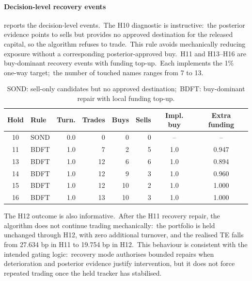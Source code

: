 \documentclass[11pt]{article}
\begin{document}
\paragraph{Decision-level recovery events}

 reports the decision-level events.\ The H10 diagnostic is instructive:\ the posterior evidence points to sells but provides no approved destination for the released capital, so the algorithm refuses to trade.\ This rule avoids mechanically reducing exposure without a corresponding posterior-approved buy.\ H11 and H13--H16 are buy-dominant recovery events with funding top-up.\ Each implements the 1\% one-way target;\ the number of touched names ranges from 7 to 13.

\begin{table}[htbp]
\centering
\caption{Decision-level recovery events in the full-horizon run.\ Turnover, implemented buy, and extra funding are one-way percentages.\ A dash indicates that no buy-side implementation was made.}
\label{tab:recovery-events}
\begin{tabular}{c l r r r r c c}
\toprule
Hold & Rule & Turn. & Trades & Buys & Sells & Impl. buy & Extra funding \\
\midrule
10 & SOND & 0.0 & 0 & 0 & 0 & -- & -- \\
11 & BDFT & 1.0 & 7 & 2 & 5 & 1.0 & 0.947 \\
13 & BDFT & 1.0 & 12 & 6 & 6 & 1.0 & 0.894 \\
14 & BDFT & 1.0 & 12 & 9 & 3 & 1.0 & 0.960 \\
15 & BDFT & 1.0 & 12 & 10 & 2 & 1.0 & 1.000 \\
16 & BDFT & 1.0 & 13 & 10 & 3 & 1.0 & 1.000 \\
\bottomrule
\end{tabular}
\caption*{SOND: sell-only candidates but no approved destination;\ BDFT: buy-dominant repair with local funding top-up.}
\end{table}

The H12 outcome is also informative.\ After the H11 recovery repair, the algorithm does not continue trading mechanically:\ the portfolio is held unchanged through H12, with zero additional turnover, and the realised TE falls from 27.634 bp in H11 to 19.754 bp in H12.\ This behaviour is consistent with the intended gating logic:\ recovery mode authorises bounded repairs when deterioration and posterior evidence justify intervention, but it does not force repeated trading once the held tracker has stabilised.
\end{document}
